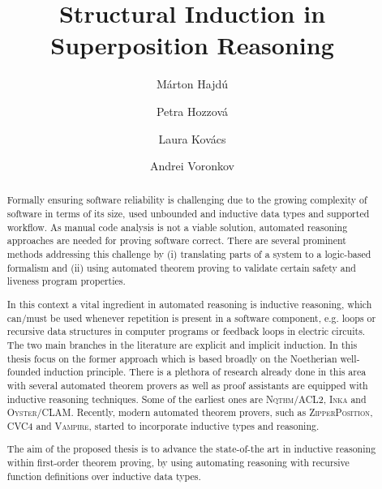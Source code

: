 \documentclass[runningheads]{llncs}
\begin{document}
%
\title{Structural Induction in Superposition Reasoning}
%
\titlerunning{ }
%
\author{M\'arton Hajd\'{u} \and Petra Hozzov\'a \and
  Laura Kov\'acs \and Andrei Voronkov}
%
\authorrunning{ }
%

%

\maketitle              %
%
\begin{abstract}

Formally ensuring software reliability is challenging due to the growing complexity of software in terms of its size, used unbounded and inductive data types and supported workflow. As manual code analysis is not a viable solution, automated reasoning approaches are needed for proving software correct. There are several prominent methods addressing this challenge by (i) translating parts of a system to a logic-based formalism and (ii) using automated theorem proving to validate certain safety and liveness program properties.

In this context a vital ingredient in automated reasoning is inductive reasoning, which can/must be used whenever repetition is present in a software component, e.g. loops or recursive data structures in computer programs or feedback loops in electric circuits. The two main branches in the literature
are explicit and implicit induction. In this thesis focus on the former approach which is based broadly on the Noetherian well-founded induction principle. There is a plethora of research already done in this area with several automated theorem provers as well as proof assistants are equipped with inductive reasoning techniques. Some of the earliest ones are \textsc{Nqthm/ACL2}, \textsc{Inka} and \textsc{Oyster/CLAM}. Recently, modern automated theorem provers, such as \textsc{ZipperPosition}, \textsc{CVC4} and \textsc{Vampire}, started to incorporate inductive types and reasoning.

The aim of the proposed thesis is to advance the state-of-the art in inductive reasoning within first-order theorem proving, by using automating reasoning with recursive function definitions over inductive data types.
\end{abstract}
\end{document}

